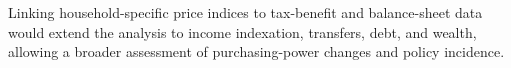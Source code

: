 \documentclass[11pt]{article}
\begin{document}
Linking household-specific price indices to tax-benefit and balance-sheet data would extend the
analysis to income indexation, transfers, debt, and wealth, allowing a broader assessment of
purchasing-power changes and policy incidence.


%






\end{document}
